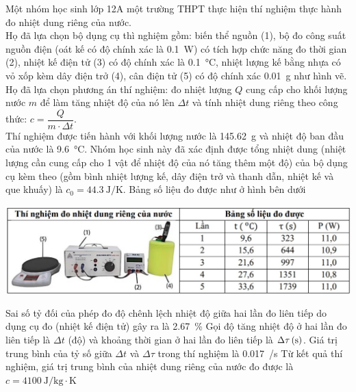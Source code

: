 \begin{ex}
	Một nhóm học sinh lớp 12A một trường THPT thực hiện thí nghiệm thực hành đo nhiệt dung riêng của nước.\\
	Họ đã lựa chọn bộ dụng cụ thì nghiệm gồm: biến thể nguồn (1), bộ đo công suất nguồn điện (oát kế có độ chính xác là \SI{0.1}{\watt}) có tích hợp chức năng đo thời gian (2), nhiệt kế điện tử (3) có độ chính xác là \SI{0.1}{\celsius}, nhiệt lượng kế bằng nhựa có vỏ xốp kèm dây điện trở (4), cân điện tử (5) có độ chính xác \SI{0.01}{\gram} như hình vẽ.\\
	Họ đã lựa chọn phương án thí nghiệm: đo nhiệt lượng $Q$ cung cấp cho khối lượng nước $m$ để làm tăng nhiệt độ của nó lên $\Delta t$ và tính nhiệt dung riêng theo công thức: $c=\dfrac{Q}{m \cdot \Delta t}$.\\
	Thí nghiệm được tiến hành với khối lượng nước là \SI{145.62}{\gram} và nhiệt độ ban đầu của nước là \SI{9.6}{\celsius}. Nhóm học sinh này đã xác định được tổng nhiệt dung (nhiệt lượng cần cung cấp cho 1 vật để nhiệt độ của nó tăng thêm một độ) của bộ dụng cụ kèm theo (gồm bình nhiệt lượng kế, dây điện trở và thanh dẫn, nhiệt kế và que khuấy) là $c_0=\SI{44.3}{\joule/\kelvin}$. Bảng số liệu đo được như ở hình bên dưới
	\begin{center}
		\includegraphics[scale=0.5]{../figs/FINAL-SEM1-005-10}
	\end{center}
	{Sai số tỷ đối của phép đo độ chênh lệch nhiệt độ giữa hai lần đo liên tiếp do dụng cụ đo (nhiệt kế điện tử) gây ra là \SI{2.67}{\percent}}
	{\True Gọi độ tăng nhiệt độ ở hai lần đo liên tiếp là $\Delta t$ (độ) và khoảng thời gian ở hai lần đo liên tiếp là $\xsi{\Delta \tau}{\left(\second\right)}{}$. Giá trị trung bình của tỷ số giữa $\Delta t$ và $\Delta \tau$ trong thí nghiệm là \SI{0.017}{/\second}}
	{Từ kết quả thí nghiệm, giá trị trung bình của nhiệt dung riêng của nước đo được là $c=\SI{4100}{\joule/\kilogram\cdot\kelvin}$}
\end{ex}
